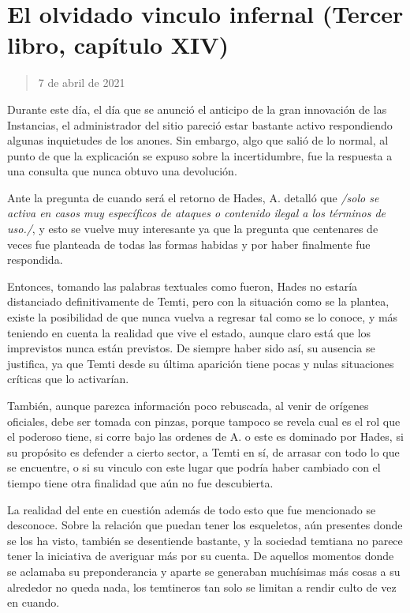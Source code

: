 \documentclass[
  spanish,
]{book}
\begin{document}
\hypertarget{el-olvidado-vinculo-infernal-tercer-libro-capuxedtulo-xiv}{%
\section{El olvidado vinculo infernal (Tercer libro, capítulo XIV)}\label{el-olvidado-vinculo-infernal-tercer-libro-capuxedtulo-xiv}}

\begin{quote}
7 de abril de 2021
\end{quote}

Durante este día, el día que se anunció el anticipo de la gran innovación de las Instancias, el administrador del sitio pareció estar bastante activo respondiendo algunas inquietudes de los anones. Sin embargo, algo que salió de lo normal, al punto de que la explicación se expuso sobre la incertidumbre, fue la respuesta a una consulta que nunca obtuvo una devolución.

Ante la pregunta de cuando será el retorno de Hades, A. detalló que \emph{/solo se activa en casos muy específicos de ataques o contenido ilegal a los términos de uso./}, y esto se vuelve muy interesante ya que la pregunta que centenares de veces fue planteada de todas las formas habidas y por haber finalmente fue respondida.

Entonces, tomando las palabras textuales como fueron, Hades no estaría distanciado definitivamente de Temti, pero con la situación como se la plantea, existe la posibilidad de que nunca vuelva a regresar tal como se lo conoce, y más teniendo en cuenta la realidad que vive el estado, aunque claro está que los imprevistos nunca están previstos. De siempre haber sido así, su ausencia se justifica, ya que Temti desde su última aparición tiene pocas y nulas situaciones críticas que lo activarían.

También, aunque parezca información poco rebuscada, al venir de orígenes oficiales, debe ser tomada con pinzas, porque tampoco se revela cual es el rol que el poderoso tiene, si corre bajo las ordenes de A. o este es dominado por Hades, si su propósito es defender a cierto sector, a Temti en sí, de arrasar con todo lo que se encuentre, o si su vinculo con este lugar que podría haber cambiado con el tiempo tiene otra finalidad que aún no fue descubierta.

La realidad del ente en cuestión además de todo esto que fue mencionado se desconoce. Sobre la relación que puedan tener los esqueletos, aún presentes donde se los ha visto, también se desentiende bastante, y la sociedad temtiana no parece tener la iniciativa de averiguar más por su cuenta. De aquellos momentos donde se aclamaba su preponderancia y aparte se generaban muchísimas más cosas a su alrededor no queda nada, los temtineros tan solo se limitan a rendir culto de vez en cuando.
\end{document}
